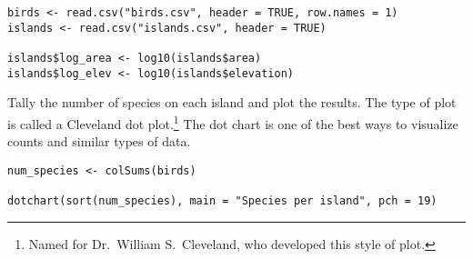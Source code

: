 \documentclass[11pt]{article}
\begin{document}
{%
\begin{verbatim}
birds <- read.csv("birds.csv", header = TRUE, row.names = 1)
islands <- read.csv("islands.csv", header = TRUE)

islands$log_area <- log10(islands$area)
islands$log_elev <- log10(islands$elevation)
\end{verbatim}
}

\medskip


\vspace{\baselineskip}


Tally the number of species on each island and plot the results. The  type of plot is called a Cleveland dot plot.\footnote{Named for Dr.~William S.~Cleveland, who developed this style of plot.} The dot chart is one of the best ways to visualize counts and similar types of data.

{%
\begin{verbatim}
num_species <- colSums(birds) 

dotchart(sort(num_species), main = "Species per island", pch = 19)
\end{verbatim}
}

\newpage
\end{document}
